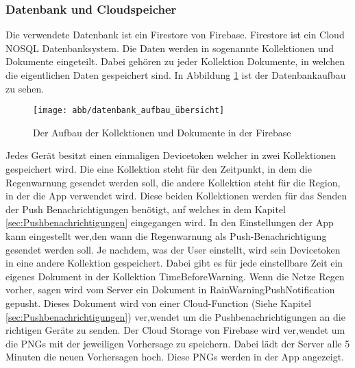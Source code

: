 \subsubsection{Datenbank und Cloudspeicher}\label{datenbank und cloudspeicher}
Die verwendete Datenbank ist ein Firestore von Firebase. Firestore ist ein Cloud NOSQL Datenbanksystem. 
Die Daten werden in sogenannte Kollektionen und Dokumente eingeteilt. 
Dabei gehören zu jeder Kollektion Dokumente, in welchen die eigentlichen Daten gespeichert sind. 
In Abbildung \ref{fig:datenbank_aufbau} ist der Datenbankaufbau zu sehen.
\begin{figure}[h]
 \centering
 \texttt{[image: abb/datenbank\_aufbau\_übersicht]}
 \caption[Datenbankarchitektur]{Der Aufbau der Kollektionen und Dokumente in der Firebase}
\label{fig:datenbank_aufbau}
\end{figure}

Jedes Gerät besitzt einen einmaligen Devicetoken welcher in zwei Kollektionen gespeichert wird. 
Die eine Kollektion steht für den Zeitpunkt, in dem die Regenwarnung gesendet werden soll, die andere Kollektion steht für die Region, in der die App verwendet wird. 
Diese beiden Kollektionen werden für das Senden der Push Benachrichtigungen benötigt, auf welches in dem Kapitel \ref{sec:Pushbenachrichtigungen} eingegangen wird. 
In den Einstellungen der App kann eingestellt wer,den wann die Regenwarnung als Push-Benachrichtigung gesendet werden soll.
Je nachdem, was der User einstellt, wird sein Devicetoken in eine andere Kollektion gespeichert. 
Dabei gibt es für jede einstellbare Zeit ein eigenes Dokument in der Kollektion TimeBeforeWarning. 
Wenn die Netze Regen vorher, sagen wird vom Server ein Dokument in RainWarningPushNotification gepusht. 
Dieses Dokument wird von einer Cloud-Function (Siehe Kapitel \ref{sec:Pushbenachrichtigungen}) ver,wendet um die Pushbenachrichtigungen an die richtigen Geräte zu senden.
Der Cloud Storage von Firebase wird ver,wendet um die PNGs mit der jeweiligen Vorhersage zu speichern.
Dabei lädt der Server alle 5 Minuten die neuen Vorhersagen hoch. Diese PNGs werden in der App angezeigt.